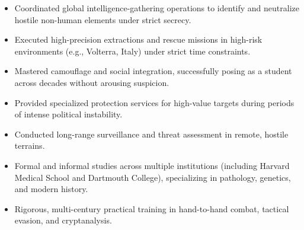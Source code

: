\documentclass[10pt,a4paper]{altacv}
\begin{document}

\begin{fullwidth}
\makecvheader
\end{fullwidth}


\begin{itemize}
\item Coordinated global intelligence-gathering operations to identify and neutralize hostile non-human elements under strict secrecy.
\item Executed high-precision extractions and rescue missions in high-risk environments (e.g., Volterra, Italy) under strict time constraints.
\item Mastered camouflage and social integration, successfully posing as a student across decades without arousing suspicion.
\end{itemize}

\divider

\begin{itemize}
\item Provided specialized protection services for high-value targets during periods of intense political instability.
\item Conducted long-range surveillance and threat assessment in remote, hostile terrains.
\end{itemize}


\begin{itemize}
\item Formal and informal studies across multiple institutions (including Harvard Medical School and Dartmouth College), specializing in pathology, genetics, and modern history.
\item Rigorous, multi-century practical training in hand-to-hand combat, tactical evasion, and cryptanalysis.
\end{itemize}

\clearpage
\end{document}
